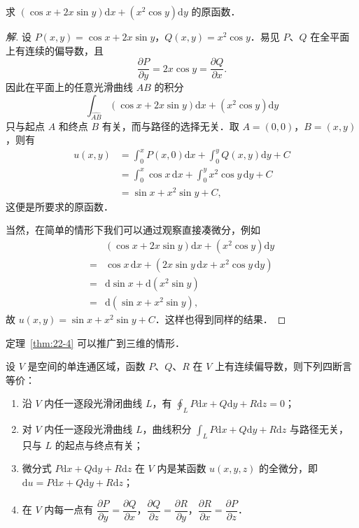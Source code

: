 \begin{example}\label{ex:22-2-2}
求 $\left(\cos x+2x\sin y\right)\mathrm{d}x+\left(x^{2}\cos y\right)\mathrm{d}y$ 的原函数．
\end{example}

\begin{proof}[解]
设 $P(x,y)=\cos x+2x\sin y$，$Q(x,y)=x^{2}\cos y$．易见 $P$、$Q$ 在全平面上有连续的偏导数，且
\[
\frac{\partial P}{\partial y}=2x\cos y=\frac{\partial Q}{\partial x}.
\]
因此在平面上的任意光滑曲线 $AB$ 的积分
\[
\int_{\widehat{AB}}\left(\cos x+2x\sin y\right)\mathrm{d}x+\left(x^{2}\cos y\right)\mathrm{d}y
\]
只与起点 $A$ 和终点 $B$ 有关，而与路径的选择无关．取 $A=(0,0)$，$B=(x,y)$，则有
\[
\begin{aligned}
u(x,y)&=\int_{0}^{x}P(x,0)\mathrm{d}x+\int_{0}^{y}Q(x,y)\mathrm{d}y+C\\
&=\int_{0}^{x}\cos x\,\mathrm{d}x+\int_{0}^{y}x^{2}\cos y\,\mathrm{d}y+C\\
&=\sin x+x^{2}\sin y+C,
\end{aligned}
\]
这便是所要求的原函数．

当然，在简单的情形下我们可以通过观察直接凑微分，例如
\[
\begin{aligned}
&\left(\cos x+2x\sin y\right)\mathrm{d}x+\left(x^{2}\cos y\right)\mathrm{d}y\\
=&\cos x\,\mathrm{d}x+\left(2x\sin y\,\mathrm{d}x+x^{2}\cos y\,\mathrm{d}y\right)\\
=&\mathrm{d}\sin x+\mathrm{d}\left(x^{2}\sin y\right)\\
=&\mathrm{d}\left(\sin x+x^{2}\sin y\right),
\end{aligned}
\]
故 $u(x,y)=\sin x+x^{2}\sin y+C$．这样也得到同样的结果．
\end{proof}

定理~\ref{thm:22-4} 可以推广到三维的情形．

\begin{theorem}\label{thm:22-5}
设 $V$ 是空间的单连通区域，函数 $P$、$Q$、$R$ 在 $V$ 上有连续偏导数，则下列四断言等价：
\begin{enumerate}[label=（\arabic*）]
\item 沿 $V$ 内任一逐段光滑闭曲线 $L$，有 $\displaystyle\oint_{L}P\mathrm{d}x+Q\mathrm{d}y+R\mathrm{d}z=0$；
\item 对 $V$ 内任一逐段光滑曲线 $L$，曲线积分 $\displaystyle\int_{L}P\mathrm{d}x+Q\mathrm{d}y+R\mathrm{d}z$ 与路径无关，只与 $L$ 的起点与终点有关；
\item 微分式 $P\mathrm{d}x+Q\mathrm{d}y+R\mathrm{d}z$ 在 $V$ 内是某函数 $u(x,y,z)$ 的全微分，即 $\mathrm{d}u=P\mathrm{d}x+Q\mathrm{d}y+R\mathrm{d}z$；
\item 在 $V$ 内每一点有 $\dfrac{\partial P}{\partial y}=\dfrac{\partial Q}{\partial x}$，$\dfrac{\partial Q}{\partial z}=\dfrac{\partial R}{\partial y}$，$\dfrac{\partial R}{\partial x}=\dfrac{\partial P}{\partial z}$．
\end{enumerate}
\end{theorem}

